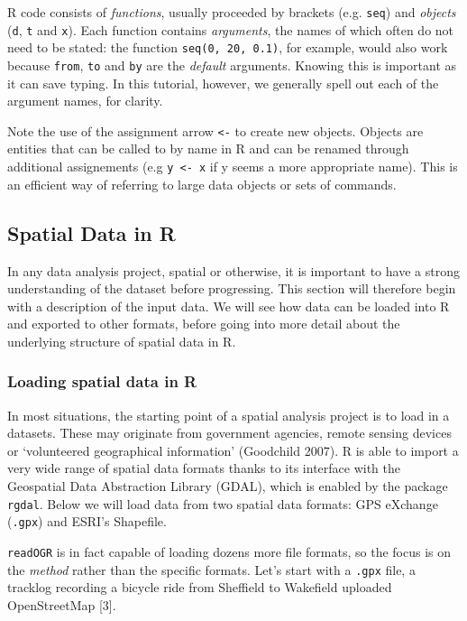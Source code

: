 \documentclass[]{article}
\begin{document}
R code consists of \emph{functions}, usually proceeded by brackets (e.g.
\texttt{seq}) and \emph{objects} (\texttt{d}, \texttt{t} and
\texttt{x}). Each function contains \emph{arguments}, the names of which
often do not need to be stated: the function \texttt{seq(0, 20, 0.1)},
for example, would also work because \texttt{from}, \texttt{to} and
\texttt{by} are the \emph{default} arguments. Knowing this is important
as it can save typing. In this tutorial, however, we generally spell out
each of the argument names, for clarity.

Note the use of the assignment arrow \texttt{\textless{}-} to create new
objects. Objects are entities that can be called to by name in R and can
be renamed through additional assignements (e.g
\texttt{y \textless{}- x} if y seems a more appropriate name). This is
an efficient way of referring to large data objects or sets of commands.

\subsection{Spatial Data in R}

In any data analysis project, spatial or otherwise, it is important to
have a strong understanding of the dataset before progressing. This
section will therefore begin with a description of the input data. We
will see how data can be loaded into R and exported to other formats,
before going into more detail about the underlying structure of spatial
data in R.

\subsubsection{Loading spatial data in R}

In most situations, the starting point of a spatial analysis project is
to load in a datasets. These may originate from government agencies,
remote sensing devices or `volunteered geographical information'
(Goodchild 2007). R is able to import a very wide range of spatial data
formats thanks to its interface with the Geospatial Data Abstraction
Library (GDAL), which is enabled by the package \texttt{rgdal}. Below we
will load data from two spatial data formats: GPS eXchange
(\texttt{.gpx}) and ESRI's Shapefile.

\texttt{readOGR} is in fact capable of loading dozens more file formats,
so the focus is on the \emph{method} rather than the specific formats.
Let's start with a \texttt{.gpx} file, a tracklog recording a bicycle
ride from Sheffield to Wakefield uploaded OpenStreetMap {[}3{]}.
\end{document}
